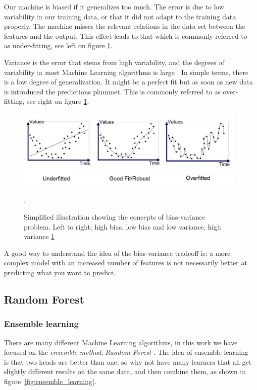 Our machine is biased if it generalizes too much. The error is due to low variability in our training data, or that it did not adapt to the training data properly. The machine misses the relevant relations in the data set between the features and the output. This effect leads to that which is commonly referred to as under-fitting, see left on figure \ref{fig:bias_var}.

Variance is the error that stems from high variability, and the degrees of variability in most Machine Learning algorithms is large \cite{marsland2014machine}. In simple terms, there is a low degree of generalization. It might be a perfect fit but as soon as new data is introduced the predictions plummet. This is commonly referred to as over-fitting, see right on figure \ref{fig:bias_var}.

\begin{figure}[h]
     \centering
     \includegraphics[width=\linewidth]{theory/figures/Bias_variance.png}
     \caption{Simplified illustration showing the concepts of bias-variance problem. Left to right; high bias, low bias and low variance, high variance \ref{fig:bias_var}}.
     \label{fig:bias_var}
\end{figure}

A good way to understand the idea of the bias-variance tradeoff is: a more complex model with an increased number of features is not necessarily better at predicting what you want to predict.


\subsection{Random Forest}

\subsubsection{Ensemble learning}
	There are many different Machine Learning algorithms, in this work we have focused on the \textit{ensemble method}; \textit{Random Forest} \cite{breiman2001random}. The idea of ensemble learning is that two heads are better than one, so why not have many learners that all get slightly different results on the same data, and then combine them, as shown in figure \ref{fig:ensemble_learning}.
	
